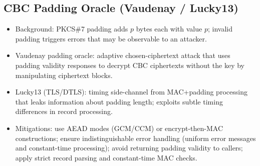 \documentclass[12pt]{article}
\begin{document}
\subsection{CBC Padding Oracle (Vaudenay / Lucky13)}
\begin{itemize}
  \item Background: PKCS\#7 padding adds $p$ bytes each with value $p$; invalid padding triggers errors that may be observable to an attacker.
  \item Vaudenay padding oracle: adaptive chosen-ciphertext attack that uses padding validity responses to decrypt CBC ciphertexts without the key by manipulating ciphertext blocks.
  \item Lucky13 (TLS/DTLS): timing side-channel from MAC+padding processing that leaks information about padding length; exploits subtle timing differences in record processing.
  \item Mitigations: use AEAD modes (GCM/CCM) or encrypt-then-MAC constructions; ensure indistinguishable error handling (uniform error messages and constant-time processing); avoid returning padding validity to callers; apply strict record parsing and constant-time MAC checks.
\end{itemize}
\end{document}
